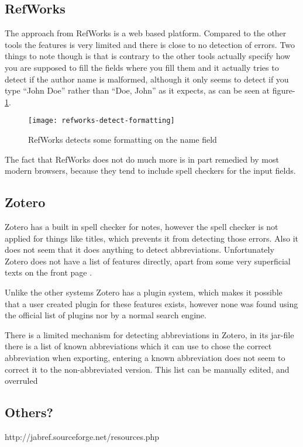 \subsection{RefWorks}
The approach from RefWorks is a web based platform.  Compared to the
other tools the features is very limited and there is close to no
detection of errors.  Two things to note though is that is contrary to
the other tools actually specify how you are supposed to fill the
fields where you fill them and it actually tries to detect if the
author name is malformed, although it only seems to detect if you type
``John Doe'' rather than ``Doe, John'' as it expects, as can be seen
at figure-\ref{fig:refworks-detect-formatting}.

\begin{figure}[h]
    \centering
    \texttt{[image: refworks-detect-formatting]}
    \caption{RefWorks detects some formatting on the name field}
    \label{fig:refworks-detect-formatting}
\end{figure}

The fact that RefWorks does not do much more is in part remedied by
most modern browsers, because they tend to include spell checkers for
the input fields.

\subsection{Zotero}
Zotero has a built in spell checker for notes, however the spell
checker is not applied for things like titles, which prevents it from
detecting those errors.  Also it does not seem that it does anything
to detect abbreviations.  Unfortunately Zotero does not have a list of
features directly, apart from some very superficial texts on the front
page \cite{zotero_features}.

Unlike the other systems Zotero has a plugin system, which makes it
possible that a user created plugin for these features exists, however
none was found using the official list of plugins
\cite{zotero_plugins} nor by a normal search engine.

There is a limited mechanism for detecting abbreviations in Zotero, in
its jar-file there is a list of known abbreviations which it can use
to chose the correct abbreviation when exporting, entering a known
abbreviation does not seem to correct it to the non-abbreviated
version.  This list can be manually edited, and overruled
\cite{zotero_abbreviations}

\subsection{Others?}

http://jabref.sourceforge.net/resources.php

